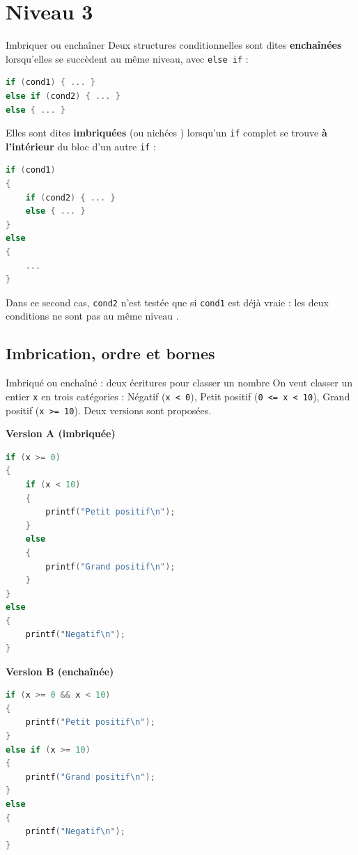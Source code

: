 \section{Niveau 3}

\begin{UPSTIinfor}{Imbriquer ou enchaîner}
    Deux structures conditionnelles sont dites \textbf{enchaînées} lorsqu'elles se succèdent au même niveau, avec \texttt{else if} :
    \begin{lstlisting}[language=C]
if (cond1) { ... }
else if (cond2) { ... }
else { ... }
    \end{lstlisting}
    Elles sont dites \textbf{imbriquées} (ou \og nichées \fg) lorsqu'un \texttt{if} complet se trouve \textbf{à l'intérieur} du bloc d'un autre \texttt{if} :
    \begin{lstlisting}[language=C]
if (cond1)
{
    if (cond2) { ... }
    else { ... }
}
else
{
    ...
}
    \end{lstlisting}
    Dans ce second cas, \texttt{cond2} n'est testée que si \texttt{cond1} est déjà vraie : les deux conditions ne sont pas au même \og niveau \fg.
\end{UPSTIinfor}

\subsection{Imbrication, ordre et bornes}

\begin{UPSTIexercice}{Imbriqué ou enchaîné : deux écritures pour classer un nombre}
    On veut classer un entier \texttt{x} en trois catégories : \og Négatif \fg{} (\texttt{x < 0}), \og Petit positif \fg{} (\texttt{0 <= x < 10}), \og Grand positif \fg{} (\texttt{x >= 10}). Deux versions sont proposées.

    \noindent
    \begin{minipage}[t]{0.48\linewidth}
        \textbf{Version A (imbriquée)}
        \begin{lstlisting}[language=C]
if (x >= 0)
{
    if (x < 10)
    {
        printf("Petit positif\n");
    }
    else
    {
        printf("Grand positif\n");
    }
}
else
{
    printf("Negatif\n");
}
        \end{lstlisting}
    \end{minipage}\hfill
    \begin{minipage}[t]{0.48\linewidth}
        \textbf{Version B (enchaînée)}
        \begin{lstlisting}[language=C]
if (x >= 0 && x < 10)
{
    printf("Petit positif\n");
}
else if (x >= 10)
{
    printf("Grand positif\n");
}
else
{
    printf("Negatif\n");
}
        \end{lstlisting}
    \end{minipage}

\end{UPSTIexercice}

